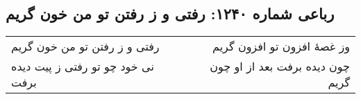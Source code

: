 \begin{center}
\section*{رباعی شماره ۱۲۴۰: رفتی و ز رفتن تو من خون گریم}
\label{sec:1240}
\begin{longtable}{l p{0.5cm} r}
رفتی و ز رفتن تو من خون گریم
&&
وز غصهٔ افزون تو افزون گریم
\\
نی خود چو تو رفتی ز پیت دیده برفت
&&
چون دیده برفت بعد از او چون گریم
\\
\end{longtable}
\end{center}
